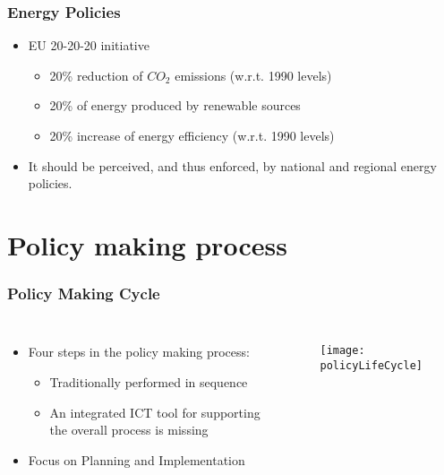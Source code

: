 \documentclass{beamer}
\begin{document}
 	\begin{frame}
	\frametitle{Energy Policies}
		\begin{itemize}
			\item EU 20-20-20 initiative
			\begin{itemize}
				\item 20\% reduction of $CO_2$ emissions (w.r.t. 1990 levels)
				\item 20\% of energy produced by renewable sources
				\item 20\% increase of energy efficiency (w.r.t. 1990 levels) 
			\end{itemize}
			\item It should be perceived, and thus enforced, by	national and regional energy policies.
		\end{itemize}
 	\end{frame}
 	
 	
\section{Policy making process}
	\begin{frame}
	\frametitle{Policy Making Cycle}
		\begin{columns}
			\begin{itemize}
				\item Four steps in the policy making process: 
				\begin{itemize}
					\item Traditionally performed in sequence
					\item An integrated ICT tool for supporting the overall process is missing   
				\end{itemize}
				\item Focus on Planning and Implementation
			\end{itemize}
			\begin{figure}[hbt]
				\centering
				\texttt{[image: policyLifeCycle]}
				\label{epolicyLifeCycle}
			\end{figure}
		\end{columns}
 	\end{frame}
 	
\end{document}
